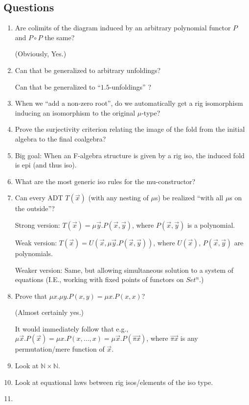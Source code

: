 \documentclass[letterpaper,numbers=enddot]{scrartcl}
\newcommand{\nat}{\mathbb{N}}
\begin{document}
\subsection*{Questions}
\begin{enumerate}
  \item Are colimits of the diagram induced by an arbitrary polynomial functor $P$ and $P \circ P$ the same?

  (Obviously, Yes.)

  \item Can that be generalized to arbitrary unfoldings?

  Can that be generalized to ``$1.5$-unfoldings'' ?

  \item When we ``add a non-zero root'', do we automatically get a
  rig isomorphism inducing an isomorphism to the original $\mu$-type?

  \item Prove the surjectivity criterion relating the image of the fold
  from the initial algebra to the final coalgebra?

  \item Big goal: When an F-algebra structure is given by a rig iso,
  the induced fold is epi (and thus iso).

  \item What are the most generic iso rules for the mu-constructor?

  \item Can every ADT $T(\vec x)$ (with any nesting of $\mu$s) be realized
  ``with all $\mu$s on the outside''?

  Strong version:  $T(\vec x) = \mu \vec y. P(\vec x, \vec y)$, where $P(\vec x, \vec y)$ is a polynomial.

  Weak version:  $T(\vec x) = U(\vec x, \mu \vec y. P(\vec x, \vec y))$, where $U(\vec x)$,
  $P(\vec x, \vec y)$ are polynomials.

  Weaker version: Same, but allowing simultaneous solution to a system of equations
  (I.E., working with fixed points of functors on $Set^n$.)

  \item Prove that $\mu x. \mu y. P(x,y) = \mu x. P(x,x)$?

  (Almost certainly yes.)

  It would immediately follow that e.g.,
  $\mu \vec x. P(\vec x) = \mu x. P(x,\dots,x) = \mu \vec x. P(\vec{\pi x})$,
  where $\vec{\pi x}$ is any permutation/mere function
  of $\vec x$.

  \item Look at $\nat \times \nat$.

  \item Look at equational laws between rig isos/elements of the iso type.

  \item
\end{enumerate}
\end{document}
